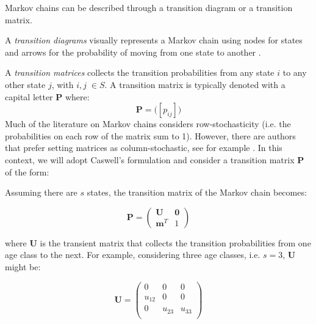 \documentclass[\main/main.tex]{subfiles}
\begin{document}
Markov chains can be described through a transition diagram or a transition matrix.

A \textit{transition diagrams} visually represents a Markov chain using nodes for states and arrows for the probability of moving from one state to another \citep{Gagniuc2017}. 

A \textit{transition matrices} collects the transition probabilities from any state $i$ to any other state $j$, with $i,j \; \in S$. A transition matrix is typically denoted with a capital letter $\mathbf{P}$ where:
\begin{equation}
    \mathbf{P} = \Big( [p_{ij}] \Big)
\end{equation}
Much of the literature on Markov chains considers row-stochasticity (i.e. the probabilities on each row of the matrix sum to 1). However, there are authors that prefer setting matrices as column-stochastic, see for example \cite{Caswell2006}. In this context, we will adopt Caswell's formulation and consider a transition matrix $\mathbf{P}$ of the form:


\begin{center}
\end{center}



Assuming there are $s$ states, the transition matrix of the Markov chain becomes:


\begin{equation}
    \mathbf{P} = \begin{pmatrix}
        \mathbf{U} &  \mathbf{0}\\
    \mathbf{m}^T& 1
    \end{pmatrix}
\end{equation}

where $\mathbf{U}$ is the transient matrix that collects the transition probabilities from one age class to the next. For example, considering three age classes, i.e. $s = 3$, $\mathbf{U}$ might be:

\begin{equation}
    \mathbf{U}= \begin{pmatrix}
    0 & 0 & 0\\
    u_{12} & 0 & 0\\
0 & u_{23} & u_{33}\\
    \end{pmatrix}
\end{equation}
\end{document}
